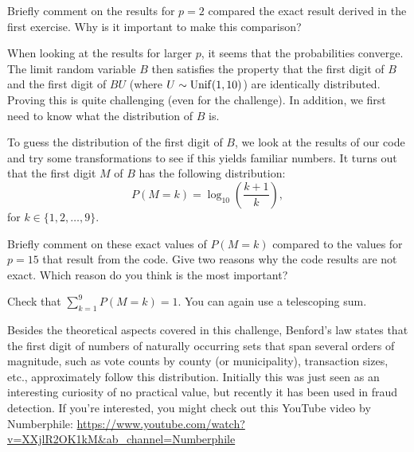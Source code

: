 \begin{exercise}
Briefly comment on the results for $p=2$ compared the exact result derived in the first exercise. Why is it important to make this comparison?
\end{exercise}

When looking at the results for larger $p$, it seems that the probabilities converge. The limit random variable $B$ then satisfies the property that the first digit of $B$ and the first digit of $BU$ (where $U \sim \mathrm{Unif}(1,10)$) are identically distributed.  Proving this is quite challenging (even for the challenge). In addition, we first need to know what the distribution of $B$ is.

To guess the  distribution of the first digit of $B$, we look at the results of our code and try some transformations to see if this yields familiar numbers. It turns out that the first digit $M$ of $B$ has the following distribution:
\begin{equation*}
P(M=k) = \log_{10}\left(\frac{k+1}{k}\right),
\end{equation*}
for $k \in \{1,2,\ldots, 9\}$.

\begin{exercise}
Briefly comment on these exact values of $P(M=k)$ compared to the values for $p=15$ that result from the code. Give two reasons why the code results are not exact. Which reason do you think is the most important?
\end{exercise}

\begin{exercise}
Check that $\sum_{k=1}^9 P(M = k) = 1$. You can again use a telescoping sum.
\end{exercise}


Besides the theoretical aspects covered in this challenge, Benford's law states that the first digit of numbers of naturally occurring sets that span several orders of magnitude, such as  vote counts by county (or municipality), transaction sizes, etc., approximately follow this distribution. Initially this was just seen as an interesting curiosity of no practical value, but recently it has been used in fraud detection. If you're interested, you might check out this YouTube video by Numberphile: \url{https://www.youtube.com/watch?v=XXjlR2OK1kM&ab_channel=Numberphile}





